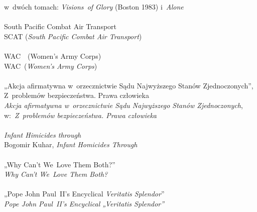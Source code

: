 \documentclass[a4paper,11pt]{article}
\begin{document}
\Powin w~dwóch tomach: \textit{Visions~of Glory} (Boston 1983)
i~\textit{Alone} \\
 \\
\Jest  South Pacific Combat Air Transport \\
\Powin SCAT (\textit{South Pacific Combat Air Transport}) \\
 \\
\Jest  WAC~~(Women's Army Corps) \\
\Powin WAC~(\textit{Women's Army Corps}) \\
 \\
\Jest „Akcja afirmatywna w~orzecznictwie Sądu Najwyższego Stanów
Zjednoczonych”, Z~problemów bezpieczeństwa. Prawa człowieka \\
\Powin \textit{Akcja afirmatywna w~orzecznictwie Sądu Najwyższego Stanów
  Zjednoczonych}, w:~\textit{Z~problemów bezpieczeństwa. Prawa człowieka} \\
 \\
\Jest \textit{Infant Himicides through} \\
\Powin Bogomir Kuhar, \textit{Infant Homicides Through} \\
 \\
\Jest  „Why Can't We~Love Them Both?” \\
\Powin \textit{Why Can't We~Love Them Both?} \\
 \\
\Jest  „Pope John Paul~II's Encyclical \textit{Veritatis Splendor}” \\
\Powin \textit{Pope John Paul~II's Encyclical „Veritatis Splendor”} \\













\newpage



\end{document}
